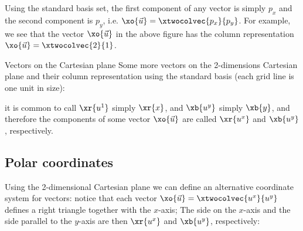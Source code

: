 Using the standard basis set, the first component of any vector is simply $p_{x}$ and the second component is $p_{y}$, i.e. $\xo{\vec{u}}=\xtwocolvec{p_{x}}{p_{y}}$. For example, we see that the vector $\xo{\vec{u}}$ in the above figure has the column representation $\xo{\vec{u}}=\xtwocolvec{2}{1}$.

\begin{example}{Vectors on the Cartesian plane}{}
  Some more vectors on the 2-dimensions Cartesian plane and their column representation using the standard basis (each grid line is one unit in size):

  \begin{center}
  \end{center}
\end{example}

it is common to call $\xr{u^{1}}$ simply $\xr{x}$, and $\xb{u^{y}}$ simply $\xb{y}$, and therefore the components of some vector $\xo{\vec{u}}$ are called $\xr{u^{x}}$ and $\xb{u^{y}}$, respectively.

\subsection{Polar coordinates}
Using the 2-dimensional Cartesian plane we can define an alternative coordinate system for vectors: notice that each vector $\xo{\vec{u}}=\xtwocolvec{u^{x}}{u^{y}}$ defines a right triangle together with the $x$-axis; The side on the $x$-axis and the side parallel to the $y$-axis are then $\xr{u^{x}}$ and $\xb{u^{y}}$, respectively:

